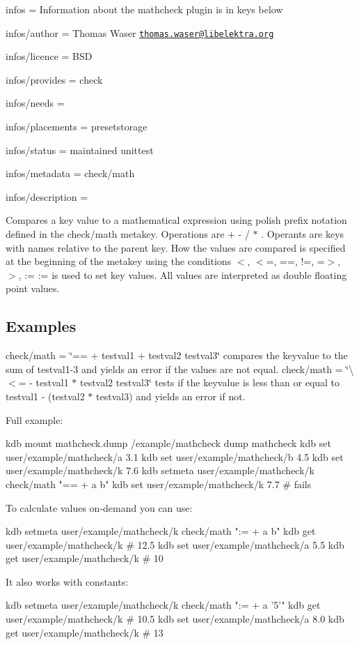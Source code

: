 
\begin{DoxyItemize}
\item infos = Information about the mathcheck plugin is in keys below
\item infos/author = Thomas Waser \href{mailto:thomas.waser@libelektra.org}{\tt thomas.\+waser@libelektra.\+org}
\item infos/licence = B\+S\+D
\item infos/provides = check
\item infos/needs =
\item infos/placements = presetstorage
\item infos/status = maintained unittest
\item infos/metadata = check/math
\item infos/description =
\end{DoxyItemize}

Compares a key value to a mathematical expression using polish prefix notation defined in the {\ttfamily check/math} metakey. Operations are {\ttfamily + -\/ / $\ast$} . Operants are keys with names relative to the parent key. How the values are compared is specified at the beginning of the metakey using the conditions {\ttfamily $<$, $<$=, ==, !=, =$>$, $>$, \+:=} {\ttfamily \+:=} is used to set key values. All values are interpreted as {\ttfamily double} floating point values.

\subsection*{Examples}

{\ttfamily check/math = \char`\"{}== + testval1 + testval2 testval3\char`\"{}} compares the keyvalue to the sum of testval1-\/3 and yields an error if the values are not equal. {\ttfamily check/math = \char`\"{}\textbackslash{}$<$= -\/ testval1 $\ast$ testval2 testval3\char`\"{}} tests if the keyvalue is less than or equal to testval1 -\/ (testval2 $\ast$ testval3) and yields an error if not.

Full example\+: \begin{DoxyVerb}    kdb mount mathcheck.dump /example/mathcheck dump mathcheck
    kdb set user/example/mathcheck/a 3.1
    kdb set user/example/mathcheck/b 4.5
    kdb set user/example/mathcheck/k 7.6
    kdb setmeta user/example/mathcheck/k check/math "== + a b"
    kdb set user/example/mathcheck/k 7.7   # fails
\end{DoxyVerb}


To calculate values on-\/demand you can use\+: \begin{DoxyVerb}    kdb setmeta user/example/mathcheck/k check/math ":= + a b"
    kdb get user/example/mathcheck/k       # 12.5
    kdb set user/example/mathcheck/a 5.5
    kdb get user/example/mathcheck/k       # 10
\end{DoxyVerb}


It also works with constants\+: \begin{DoxyVerb}    kdb setmeta user/example/mathcheck/k check/math ":= + a '5'"
    kdb get user/example/mathcheck/k       # 10.5
    kdb set user/example/mathcheck/a 8.0
    kdb get user/example/mathcheck/k       # 13\end{DoxyVerb}
 